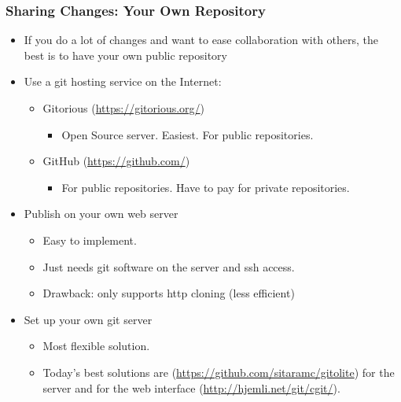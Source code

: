 \begin{frame}
  \frametitle{Sharing Changes: Your Own Repository}
  \begin{itemize}
  \item If you do a lot of changes and want to ease collaboration with
    others, the best is to have your own public repository
  \item Use a git hosting service on the Internet:
    \begin{itemize}
    \item Gitorious (\url{https://gitorious.org/})
      \begin{itemize}
      \item Open Source server. Easiest. For public repositories.
      \end{itemize}
    \item GitHub (\url{https://github.com/})
      \begin{itemize}
      \item For public repositories. Have to pay for private
        repositories.
      \end{itemize}
    \end{itemize}
  \item Publish on your own web server
    \begin{itemize}
    \item Easy to implement.
    \item Just needs git software on the server and ssh access.
    \item Drawback: only supports http cloning (less efficient)
    \end{itemize}
  \item Set up your own git server
    \begin{itemize}
    \item Most flexible solution.
    \item Today's best solutions are 
      (\url{https://github.com/sitaramc/gitolite}) for the server and
       for the web interface
      (\url{http://hjemli.net/git/cgit/}).
    \end{itemize}
  \end{itemize}
\end{frame}

